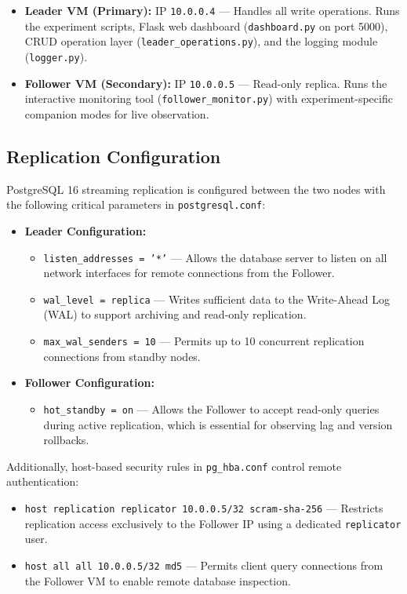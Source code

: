 \documentclass[12pt]{article}
\begin{document}
\begin{itemize}
    \item \textbf{Leader VM (Primary):} IP \texttt{10.0.0.4} --- Handles all write operations. Runs the experiment scripts, Flask web dashboard (\texttt{dashboard.py} on port 5000), CRUD operation layer (\texttt{leader\_operations.py}), and the logging module (\texttt{logger.py}).
    \item \textbf{Follower VM (Secondary):} IP \texttt{10.0.0.5} --- Read-only replica. Runs the interactive monitoring tool (\texttt{follower\_monitor.py}) with experiment-specific companion modes for live observation.
\end{itemize}


\subsection{Replication Configuration}
PostgreSQL 16 streaming replication is configured between the two nodes with the following critical parameters in \texttt{postgresql.conf}:

\begin{itemize}
    \item \textbf{Leader Configuration:}
    \begin{itemize}
        \item \texttt{listen\_addresses = '*'} --- Allows the database server to listen on all network interfaces for remote connections from the Follower.
        \item \texttt{wal\_level = replica} --- Writes sufficient data to the Write-Ahead Log (WAL) to support archiving and read-only replication.
        \item \texttt{max\_wal\_senders = 10} --- Permits up to 10 concurrent replication connections from standby nodes.
    \end{itemize}
    \item \textbf{Follower Configuration:}
    \begin{itemize}
        \item \texttt{hot\_standby = on} --- Allows the Follower to accept read-only queries during active replication, which is essential for observing lag and version rollbacks.
    \end{itemize}
\end{itemize}

Additionally, host-based security rules in \texttt{pg\_hba.conf} control remote authentication:
\begin{itemize}
    \item \texttt{host replication replicator 10.0.0.5/32 scram-sha-256} --- Restricts replication access exclusively to the Follower IP using a dedicated \texttt{replicator} user.
    \item \texttt{host all all 10.0.0.5/32 md5} --- Permits client query connections from the Follower VM to enable remote database inspection.
\end{itemize}
\end{document}

